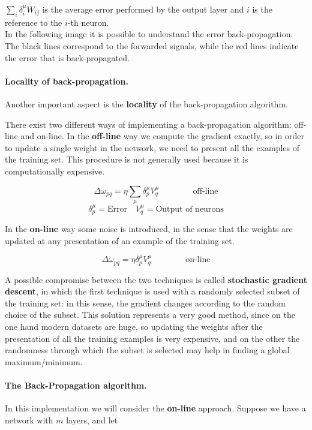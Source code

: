 $\sum_{i} \delta_{i}^{\mu} W_{ij}$ is the average error performed by the output layer and $i$ is the reference to the $i$-th neuron.\\
In the following image it is possible to understand the error back-propagation. The black lines correspond to the forwarded signals, while the red lines indicate the error that is back-propagated.

\paragraph*{Locality of back-propagation.} Another important aspect is the \textbf{locality} of the back-propagation algorithm.


There exist two different ways of implementing a back-propagation algorithm: off-line and on-line. In the \textbf{off-line} way we compute the gradient exactly, so in order to update a single weight in the network, we need to present all the examples of the training set. This procedure is not generally used because it is computationally expensive.

$$
\Delta \omega_{pq} = \eta \sum_{\mu} \delta_{p}^{\mu} V_{q}^{\mu} \qquad \qquad \text{off-line}
$$
$$
\delta_{p}^{\mu} = \text{Error} \quad V_{q}^{\mu} = \text{Output of neurons}
$$

In the \textbf{on-line} way some noise is introduced, in the sense that the weights are updated at any presentation of an example of the training set.

$$
\Delta \omega_{pq} = \eta\delta_ {p}^{\mu} V_{q}^{\mu} \qquad \qquad \text{on-line}
$$

A possible compromise between the two techniques is called \textbf{stochastic gradient descent}, in which the first technique is used with a randomly selected subset of the training set: in this sense, the gradient changes according to the random choice of the subset. This solution represents a very good method, since on the one hand modern datasets are huge, so updating the weights after the presentation of all the training examples is very expensive, and on the other the randomness through which the subset is selected may help in finding a global maximum/minimum.

\paragraph*{The Back-Propagation algorithm.} In this implementation we will consider the \textbf{on-line} approach. Suppose we have a network with $m$ layers, and let

